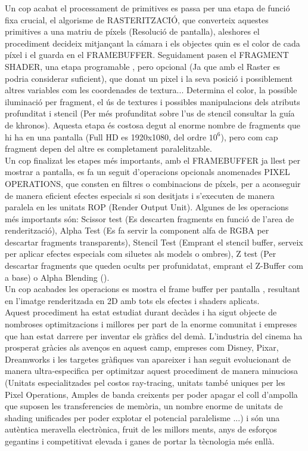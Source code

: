 \documentclass[12pt]{article}
\begin{document}
Un cop acabat el processament de primitives es passa per una etapa de funció fixa crucial, el algorisme de RASTERITZACIÓ, que converteix aquestes primitives a una matriu de píxels
(Resolució de pantalla), aleshores el procediment decideix mitjançant la cámara i els objectes quin es el color de cada píxel i el guarda en el FRAMEBUFFER. Seguidament pasen el FRAGMENT SHADER,
 una etapa programable , pero opcional (Ja que amb el Raster es podria considerar suficient), que donat un pixel i la seva posició i possiblement altres variables com les coordenades de textura...
  Determina el color, la possible iluminació per fragment, el ús de textures i possibles manipulacions dels atributs profunditat i stencil (Per més profunditat sobre l'us de stencil consultar la guía de khronos).
Aquesta etapa és costosa degut al enorme nombre de fragments que hi ha en una pantalla (Full HD es 1920x1080, del ordre $10^6$), pero com cap fragment depen del altre es completament paralelitzable.
\\

Un cop finalizat les etapes més importants, amb el FRAMEBUFFER ja llest per mostrar a pantalla, es fa un seguit d'operacions opcionals anomenades PIXEL OPERATIONS, que consten en filtres
 o combinacions de píxels, per a aconseguir de manera eficient efectes especials si son desitjats i s'executen de manera paralela en les unitats ROP (Render Output Unit). Algunes de les operacions més importants són:
Scissor test (Es descarten fragments en funció de l'area de renderització), Alpha Test (Es fa servir la component alfa de RGBA per descartar fragments transparents), Stencil Test (Emprant el stencil buffer, serveix per
aplicar efectes especials com siluetes als models o ombres), Z test (Per descartar fragments que queden ocults per profunidatat, emprant el Z-Buffer com a base) o Alpha Blending ().
\\

Un cop acabades les operacions es mostra el frame buffer per pantalla , resultant en l'imatge renderitzada en 2D amb tots els efectes i shaders aplicats.
\\ 

Aquest procediment ha estat estudiat durant decàdes i ha sigut objecte de nombroses optimitzacions i millores per part de la enorme comunitat i empreses que han estat darrere per inventar els gràfics 
del demà. L'industria del cinema ha prosperat gràcies als avenços en aquest camp, empreses com Disney, Pixar, Dreamworks i les targetes gràfiques van apareixer i han seguit evolucionant de manera ultra-especifica 
 per optimitzar aquest procediment de manera minuciosa (Unitats especialitzades pel costos ray-tracing, unitats també uniques per les Pixel Operations, Amples de banda creixents per poder apagar el coll d'ampolla que suposen 
les transferencies de memòria, un nombre enorme de unitats de shading unificades per poder explotar el potencial paralelisme ...) i són una autèntica meravella electrònica, fruit de les millors ments, anys de esforços gegantins i
competitivat elevada i ganes de portar la tècnologia més enllà.
\end{document}
